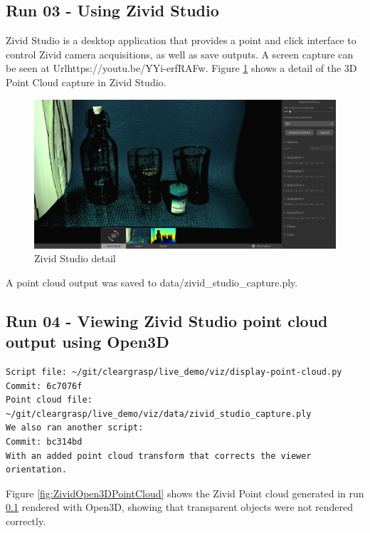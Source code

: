 \subsection{Run 03 - Using Zivid Studio}
\label{app_res:03}
Zivid Studio is a desktop application that provides a point and click interface to control Zivid camera acquisitions, as well as save outputs. A screen capture can be seen at  Url{https://youtu.be/YYi-erfRAFw}.
Figure \ref{fig:ZividStudioDetail} shows a detail of the 3D Point Cloud capture in Zivid Studio.
\begin{figure}[h!]
\centering
\includegraphics[width=\textwidth]{Figures/ZividStudioDetail.png}
\caption{Zivid Studio detail}
\label{fig:ZividStudioDetail}
\end{figure}
A point cloud output was saved to data/zivid\_studio\_capture.ply.


\subsection{Run 04 - Viewing Zivid Studio point cloud output using Open3D}
\label{app_res:04}
\begin{verbatim}
Script file: ~/git/cleargrasp/live_demo/viz/display-point-cloud.py
Commit: 6c7076f
Point cloud file: ~/git/cleargrasp/live_demo/viz/data/zivid_studio_capture.ply
We also ran another script:
Commit: bc314bd
With an added point cloud transform that corrects the viewer orientation.
\end{verbatim}
Figure \ref{fig:ZividOpen3DPointCloud} shows the Zivid Point cloud generated in run \ref{app_res:03} rendered with Open3D, showing that transparent objects were not rendered correctly.

